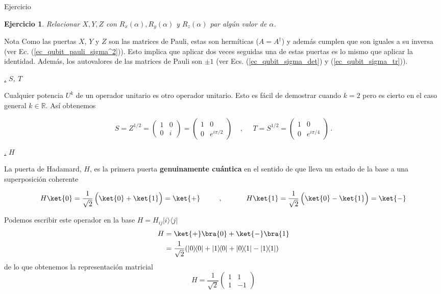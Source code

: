\documentclass[a4paper,11pt]{book} %
\newtheorem{ejercicio_contador}{Ejercicio}
\newcommand{\Ejercicio}[1]{
		\begin{mybox_gray}{Ejercicio} 
			\begin{ejercicio_contador}
				 #1 
			\end{ejercicio_contador} 
		\end{mybox_gray}
	}
\numberwithin{equation}{chapter}
\def\lp{\left(}
\def\rp{\right)}
\newcommand{\ketbra}[2]{| #1\rangle \! \langle #2|}
\def\subsubiContadorIt{\par\addtocounter{subsubsection}{1}\underline{\it\thesubsubsection.}\hskip0.5cm \setcounter{subsubsubsectionIt}{0}}
\newcommand{\SubsubiIt}[1]{
		\subsubiContadorIt \textit{#1}
	}
\newcounter{subsubsubsectionIt}[subsubsection]
\begin{document}
\Ejercicio{
Relacionar  $X,Y,Z$ con   $R_x(\alpha),R_y(\alpha)$ y $R_z(\alpha)$ par algún valor de $\alpha$.
}
            
	\begin{mybox_blue}{Nota}
	Como las puertas $X$, $Y$ y $Z$ son las matrices de Pauli, estas son hermíticas ($A = A^\dagger$) y 
	además cumplen que son iguales a su inversa (ver Ec. (\ref{ec_qubit_pauli_sigma^2})). 
	Esto implica que aplicar dos veces seguidas una de estas puertas es lo mismo que aplicar la identidad. 
	Además, los autovalores de las matrices de Pauli son $\pm 1$ (ver Ecs. (\ref{ec_qubit_sigma_det}) y (\ref{ec_qubit_sigma_tr})).
	\end{mybox_blue}


            \SubsubiIt{$S$, $T$}

Cualquier potencia $U^k$ de un operador unitario es otro operador unitario. Esto es fácil de demostrar cuando $k=2$ pero es cierto en el caso general $k\in{\mathbb R}$. Así obtenemos

	\begin{equation}
	\boxed{S = Z^{1/2} =  \lp\begin{matrix}1&0\\0&i\end{matrix}\rp = \lp\begin{matrix}1&0\\0&e^{i\pi/2}\end{matrix} \rp}
	~~~~~,~~~~~~ 
	\boxed{T = S^{1/2} = \lp \begin{matrix} 1&0 \\ 0 & e^{i\pi/4} \end{matrix} \rp} \, .
	\end{equation}
            
            \SubsubiIt{$H$}
       
La puerta de Hadamard, $H$, es la primera puerta \textbf{genuinamente cuántica} en el sentido de que lleva un estado de la base a una superposición coherente

	\begin{equation}
	H \ket{0} = \frac{1}{\sqrt{2}}\left(\rule{0mm}{4mm}\ket{0} + \ket{1}\right) =\ket{+} 
	 ~~~~~~~~,~~~~~~~~~~
	H \ket{1} = \frac{1}{\sqrt{2}}\left(\rule{0mm}{4mm}\ket{0} - \ket{1}\right) =\ket{-} 
	\end{equation}

Podemos escribir este operador en la base $H = H_{ij}\ketbra{i}{j}$
	\begin{align*}
	H &=  \ket{+}\bra{0} +  \ket{-}\bra{1} \\
	  &= \frac{1}{\sqrt{2}}(\ketbra{0}{0} + \ketbra{1}{0} + \ketbra{0}{1} - \ketbra{1}{1})
	\end{align*}
de  lo que obtenemos la representación matricial
	\begin{equation} \label{ec_puertas_simples_H}
	\boxed{H   =  \frac{1}{\sqrt{2}} \lp \begin{matrix} 1 & 1 \\ 1 & -1 \end{matrix} \rp}
	\end{equation}
\end{document}
